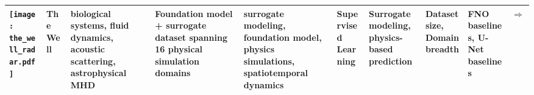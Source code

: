 \begin{landscape}
{\begin{longtable}{|p{}|p{}|p{}|p{}|p{}|p{}|p{}|p{}|p{}|p{}|}
\texttt{[image: the\_well\_radar.pdf]} & The Well & biological systems, fluid dynamics, acoustic scattering, astrophysical MHD & Foundation model + surrogate dataset spanning 16 physical simulation domains & surrogate modeling, foundation model, physics simulations, spatiotemporal dynamics & Supervised Learning & Surrogate modeling, physics-based prediction & Dataset size, Domain breadth & FNO baselines, U-Net baselines & \cite{neurips2024_4f9a5acd}\href{https://polymathic-ai.org/the\_well/}{$\Rightarrow$} \\ \hline
\end{longtable}
}

\end{landscape}
